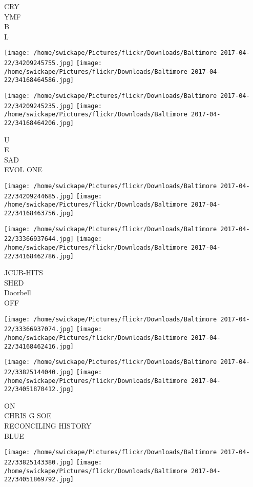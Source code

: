 \documentclass[10pt,letterpaper]{article}
\begin{document}
CRY\\
YMF\\
B\\
L
\pagebreak

\texttt{[image: /home/swickape/Pictures/flickr/Downloads/Baltimore 2017-04-22/34209245755.jpg]}
\texttt{[image: /home/swickape/Pictures/flickr/Downloads/Baltimore 2017-04-22/34168464586.jpg]}

\texttt{[image: /home/swickape/Pictures/flickr/Downloads/Baltimore 2017-04-22/34209245235.jpg]}
\texttt{[image: /home/swickape/Pictures/flickr/Downloads/Baltimore 2017-04-22/34168464206.jpg]}

U\\
E\\
SAD\\
EVOL ONE
\pagebreak

\texttt{[image: /home/swickape/Pictures/flickr/Downloads/Baltimore 2017-04-22/34209244685.jpg]}
\texttt{[image: /home/swickape/Pictures/flickr/Downloads/Baltimore 2017-04-22/34168463756.jpg]}

\texttt{[image: /home/swickape/Pictures/flickr/Downloads/Baltimore 2017-04-22/33366937644.jpg]}
\texttt{[image: /home/swickape/Pictures/flickr/Downloads/Baltimore 2017-04-22/34168462786.jpg]}

JCUB{-}HITS\\
SHED\\
Doorbell\\
OFF
\pagebreak

\texttt{[image: /home/swickape/Pictures/flickr/Downloads/Baltimore 2017-04-22/33366937074.jpg]}
\texttt{[image: /home/swickape/Pictures/flickr/Downloads/Baltimore 2017-04-22/34168462416.jpg]}

\texttt{[image: /home/swickape/Pictures/flickr/Downloads/Baltimore 2017-04-22/33825144040.jpg]}
\texttt{[image: /home/swickape/Pictures/flickr/Downloads/Baltimore 2017-04-22/34051870412.jpg]}

ON\\
CHRIS G SOE\\
RECONCILING HISTORY\\
BLUE
\pagebreak

\texttt{[image: /home/swickape/Pictures/flickr/Downloads/Baltimore 2017-04-22/33825143380.jpg]}
\texttt{[image: /home/swickape/Pictures/flickr/Downloads/Baltimore 2017-04-22/34051869792.jpg]}
\end{document}
